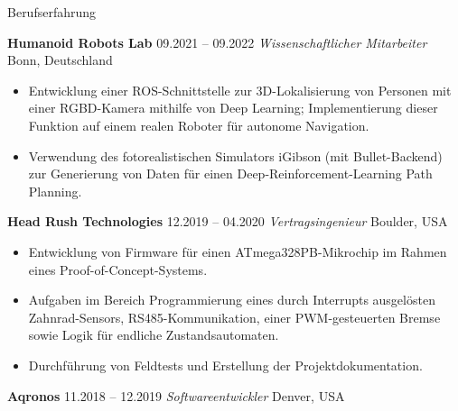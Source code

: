 \begin{rubric}{Berufserfahrung}

%
%
\entry*[] \textbf{Humanoid Robots Lab} \hfill 09.2021 -- 09.2022 \newline  
 \emph{Wissenschaftlicher Mitarbeiter} \hfill Bonn, Deutschland \newline  
\vspace{\CVItemizeHeaderSpacing} \begin{itemize}[leftmargin=*, rightmargin=1cm]
	\setlength{\itemsep}{\CVItemizeSpacing}  
	\item Entwicklung einer ROS-Schnittstelle zur 3D-Lokalisierung von Personen mit einer RGBD-Kamera mithilfe von Deep Learning; Implementierung dieser Funktion auf einem realen Roboter für autonome Navigation. 
	\item Verwendung des fotorealistischen Simulators iGibson (mit Bullet-Backend) zur Generierung von Daten für einen Deep-Reinforcement-Learning Path Planning.  
\end{itemize}
%
%
\entry*[] \textbf{Head Rush Technologies} \hfill 12.2019 -- 04.2020 \newline  
 \emph{Vertragsingenieur} \hfill Boulder, USA \newline  
\vspace{\CVItemizeHeaderSpacing} \begin{itemize}[leftmargin=*, rightmargin=1cm]
	\setlength{\itemsep}{\CVItemizeSpacing}  
	\item Entwicklung von Firmware für einen ATmega328PB-Mikrochip im Rahmen eines Proof-of-Concept-Systems.
	\item Aufgaben im Bereich Programmierung eines durch Interrupts ausgelösten Zahnrad-Sensors, RS485-Kommunikation, einer PWM-gesteuerten Bremse sowie Logik für endliche Zustandsautomaten.  
	\item Durchführung von Feldtests und Erstellung der Projektdokumentation.  
\end{itemize}
%
%
\entry*[] \textbf{Aqronos} \hfill 11.2018 -- 12.2019 \newline  
\emph{Softwareentwickler} \hfill Denver, USA \newline  

\end{rubric}
